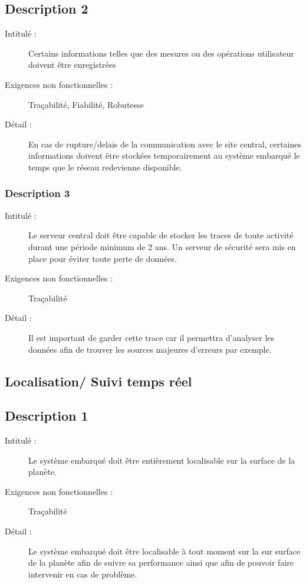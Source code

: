 \documentclass[11pt]{article}
\begin{document}
\subsection {Description 2}
\begin{description}
           \item[Intitulé :] Certains informations telles que des mesures ou des opérations utilisateur doivent être enregistrées 
           \item[Exigences non fonctionnelles :] Traçabilité, Fiabilité, Robutesse
           \item[Détail :] En cas de rupture/delais de la communication avec le site central, certaines informations doivent être stockées temporairement au système embarqué  le temps que le 
réseau redevienne disponible.
\end{description}

\subsubsection {Description 3}
\begin{description}
           \item[Intitulé :] Le serveur central doit être capable de stocker les traces de toute activité durant une période minimum de 2 ans. Un serveur de sécurité sera mis en place pour éviter toute perte de données. 
           \item[Exigences non fonctionnelles :] Traçabilité
           \item[Détail :] Il est important de garder cette trace car il permettra d’analyser les données afin de trouver les sources majeures d’erreurs par exemple. 
\end{description}


\subsection {Localisation/ Suivi temps réel}
\subsection {Description 1}
\begin{description}
           \item[Intitulé :] Le système embarqué doit être entièrement localisable sur la surface de la planète. 
           \item[Exigences non fonctionnelles :] Traçabilité
           \item[Détail :] Le système embarqué doit être localisable à tout moment sur la sur surface de la planète afin de suivre sa performance ainsi que afin de pouvoir faire intervenir en cas de problème. 
\end{description}
\end{document}
